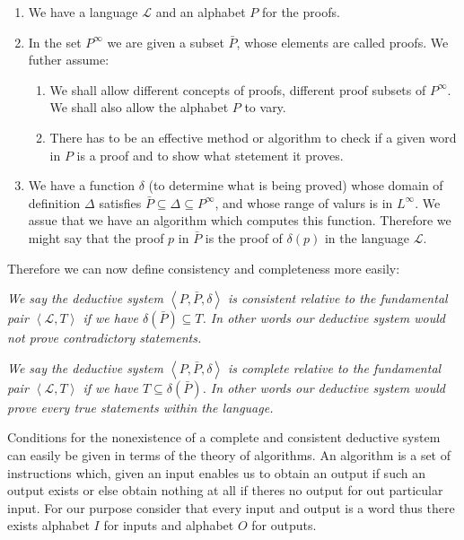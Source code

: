 \documentclass[10pt,a4paper]{article}
\newcounter{theo}
\newcommand{\curveL}{\mathcal{L}}
\begin{document}
                        \begin{enumerate}
                            \item We have a language $\curveL$ and an alphabet $P$ for the proofs. 
                            \item In the set $P^\infty$ we are given a subset $\bar P$, whose elements are called proofs. We futher assume:
                            \begin{enumerate}
                                \item We shall allow different concepts of proofs, different proof subsets of $P^\infty$. We shall also allow the alphabet $P$ to vary.
                                \item There has to be an effective method or algorithm to check if a given word in $P$ is a proof and to show what stetement it proves.
                            \end{enumerate}
                            \item We have a function $\delta$ (to determine what is being proved) whose domain of definition $\Delta$ satisfies $\bar P\subseteq \Delta\subseteq P^\infty$, and whose range of valurs is in $L^\infty$. We assue that we have an algorithm which computes this function. Therefore we might say that the proof $p$ in $\bar P$ is the proof of $\delta(p)$ in the language $\curveL$.
                        \end{enumerate}
                        Therefore we can now define consistency and completeness more easily:
                        \begin{define}
                            \textit{We say the deductive system $\left<P,\bar P, \delta\right>$ is consistent relative to the fundamental pair $\left<\curveL,T\right>$ if we have $\delta(\bar P) \subseteq T$. In other words our deductive system would not prove contradictory statements.}
                        \end{define}
                        \begin{define}
                            \textit{We say the deductive system $\left<P,\bar P, \delta\right>$ is complete relative to the fundamental pair $\left<\curveL,T\right>$ if we have $T \subseteq \delta(\bar P)$. In other words our deductive system would prove every true statements within the language.}
                        \end{define}
                        Conditions for the nonexistence of a complete and consistent deductive system can easily be given in terms of the theory of algorithms. An algorithm is a set of instructions which, given an input enables us to obtain an output if such an output exists or else obtain nothing at all if theres no output for out particular input. For our purpose consider that every input and output is a word thus there exists alphabet $I$ for inputs and alphabet $O$ for outputs.
\end{document}
